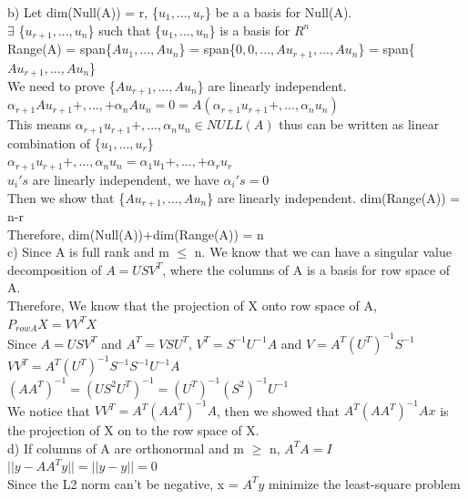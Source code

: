 \documentclass[11pt]{article}
\begin{document}
b) Let dim(Null(A)) = r,  \{$u_1,...,u_r$\}  be a a basis for Null(A). \\$\exists$ \{$u_{r+1},...,u_{n}$\} such that \{$u_1,...,u_n$\} is a basis for $R^n$\\
Range(A) = span\{$Au_1,...,Au_n$\} = span\{$0,0,...,Au_{r+1},...,Au_n$\} = span\{$Au_{r+1},...,Au_n$\} \\
We need to prove \{$Au_{r+1},...,Au_n$\}  are linearly independent.\\
$\alpha_{r+1}Au_{r+1}+,...,+\alpha_n Au_n = 0 = A(\alpha_{r+1}u_{r+1}+,...,\alpha_n u_n) $\\
This means $ \alpha_{r+1}u_{r+1}+,...,\alpha_n u_n \in NULL(A)$ thus can be written as linear combination of  \{$u_1,...,u_r$\}\\
$ \alpha_{r+1}u_{r+1}+,...,\alpha_n u_n  = \alpha_1 u_1 + ,..., +\alpha_r u_r$\\
$u_i's$ are linearly independent, we have $\alpha_i's = 0$\\
Then we show that \{$Au_{r+1},...,Au_n$\}  are linearly independent. dim(Range(A)) = n-r\\
Therefore, dim(Null(A))+dim(Range(A))  = n\\

c) Since A is full rank and m $\leq$ n. We know that we can have a singular value decomposition of $A = USV^T$, where the columns of A is a basis for row space of A.\\
Therefore, We know that the projection of X onto row space of A, $P_{row A } X= VV^TX$ \\
Since $A = USV^T$ and $A^T = VSU^T$, $V^T = S^{-1} U^{-1}A$ and $V  = A^T (U^T)^{-1}S^{-1}$ \\
$VV^T = A^T (U^T)^{-1}S^{-1} S^{-1} U^{-1}A$\\
$(AA^T)^{-1} = (US^2U^T)^{-1} = (U^T)^{-1}(S^2)^{-1}U^{-1}$\\
We notice that $VV^T  = A^T(AA^T)^{-1}A$, then we showed that $A^T(AA^T)^{-1}Ax$ is the projection of X on to the row space of X.\\


d) If columns of A are orthonormal and m $\geq $ n, $A^TA = I$  \\
$||y - AA^Ty|| = ||y-y|| = 0$ \\
Since the L2 norm can't be negative, x = $A^T y $ minimize the least-square problem 
\end{document}
